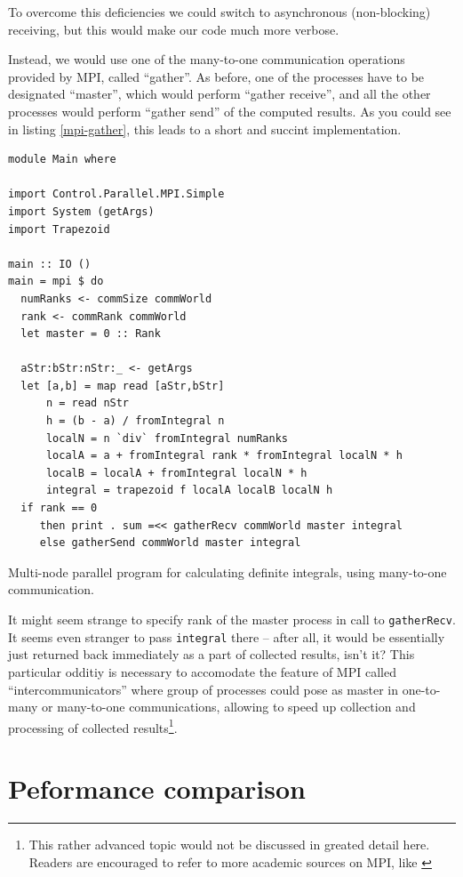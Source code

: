 \documentclass{tmr}
\begin{document}
To overcome this deficiencies we could switch to asynchronous
(non-blocking) receiving, but this would make our code much more
verbose.

Instead, we would use one of the many-to-one communication operations
provided by MPI, called ``gather''. As before, one of the processes
have to be designated ``master'', which would perform ``gather
receive'', and all the other processes would perform ``gather send''
of the computed results. As you could see in listing \ref{mpi-gather},
this leads to a short and succint implementation.

\begin{listing}
\begin{Verbatim}
module Main where

import Control.Parallel.MPI.Simple
import System (getArgs)
import Trapezoid

main :: IO ()
main = mpi $ do
  numRanks <- commSize commWorld
  rank <- commRank commWorld
  let master = 0 :: Rank
  
  aStr:bStr:nStr:_ <- getArgs
  let [a,b] = map read [aStr,bStr]
      n = read nStr
      h = (b - a) / fromIntegral n
      localN = n `div` fromIntegral numRanks
      localA = a + fromIntegral rank * fromIntegral localN * h
      localB = localA + fromIntegral localN * h
      integral = trapezoid f localA localB localN h
  if rank == 0
     then print . sum =<< gatherRecv commWorld master integral
     else gatherSend commWorld master integral
\end{Verbatim}
\caption{Multi-node parallel program for calculating definite
  integrals, using many-to-one communication. \label{mpi-gather}}
\end{listing}

It might seem strange to specify rank of the master process in call to
\verb|gatherRecv|. It seems even stranger to pass \verb|integral|
there -- after all, it would be essentially just returned back
immediately as a part of collected results, isn't it? This particular
odditiy is necessary to accomodate the feature of MPI called
``intercommunicators'' where group of processes could pose as master
in one-to-many or many-to-one communications, allowing to speed up
collection and processing of collected results\footnote{This rather
  advanced topic would not be discussed in greated detail here.
  Readers are encouraged to refer to more academic sources on MPI,
  like \cite{2}}.

\section{Peformance comparison}
\end{document}

